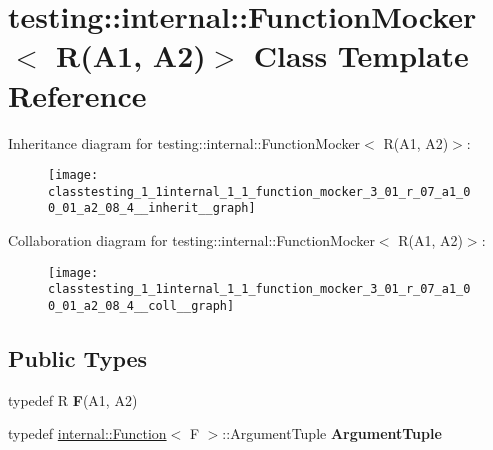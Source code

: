 \hypertarget{classtesting_1_1internal_1_1_function_mocker_3_01_r_07_a1_00_01_a2_08_4}{}\section{testing\+:\+:internal\+:\+:Function\+Mocker$<$ R(A1, A2)$>$ Class Template Reference}
\label{classtesting_1_1internal_1_1_function_mocker_3_01_r_07_a1_00_01_a2_08_4}


Inheritance diagram for testing\+:\+:internal\+:\+:Function\+Mocker$<$ R(A1, A2)$>$\+:
\nopagebreak
\begin{figure}[H]
\begin{center}
\leavevmode
\texttt{[image: classtesting\_1\_1internal\_1\_1\_function\_mocker\_3\_01\_r\_07\_a1\_00\_01\_a2\_08\_4\_\_inherit\_\_graph]}
\end{center}
\end{figure}


Collaboration diagram for testing\+:\+:internal\+:\+:Function\+Mocker$<$ R(A1, A2)$>$\+:
\nopagebreak
\begin{figure}[H]
\begin{center}
\leavevmode
\texttt{[image: classtesting\_1\_1internal\_1\_1\_function\_mocker\_3\_01\_r\_07\_a1\_00\_01\_a2\_08\_4\_\_coll\_\_graph]}
\end{center}
\end{figure}
\subsection*{Public Types}
\begin{DoxyCompactItemize}
\item 
\mbox{\label{classtesting_1_1internal_1_1_function_mocker_3_01_r_07_a1_00_01_a2_08_4_a61302610bfc9b30588ea345e468310b2}} 
typedef R {\bfseries F}(A1, A2)
\item 
\mbox{\label{classtesting_1_1internal_1_1_function_mocker_3_01_r_07_a1_00_01_a2_08_4_ae75e3ba40a99224f7363681914212c19}} 
typedef \hyperlink{structtesting_1_1internal_1_1_function}{internal\+::\+Function}$<$ F $>$\+::Argument\+Tuple {\bfseries Argument\+Tuple}
\end{DoxyCompactItemize}
